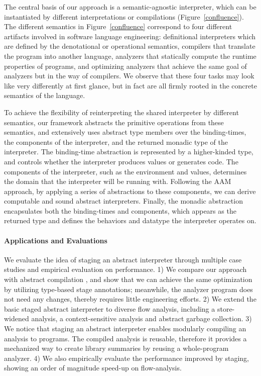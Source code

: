 The central basis of our approach is a semantic-agnostic interpreter, which can be
instantiated by different interpretations or compilations (Figure~\ref{confluence}).
The different semantics in Figure~\ref{confluence} correspond to four different
artifacts involved in software language engineering: definitional interpreters
which are defined by the denotational or operational semantics, compilers that
translate the program into another language, analyzers that statically compute the
runtime properties of programs, and optimizing analyzers that achieve the same goal
of analyzers but in the way of compilers. We observe that these four
tasks may look like very differently at first glance, but in fact are
all firmly rooted in the concrete semantics of the language.

To achieve the flexibility of reinterpreting the shared interpreter by
different semantics, our framework abstracts the primitive operations
from these semantics, and extensively uses abstract type members over
the binding-times, the components of the interpreter, and the returned
monadic type of the interpreter. The binding-time abstraction is
represented by a higher-kinded type, and controls whether the
interpreter produces values or generates code. The components of the
interpreter, such as the environment and values, determines the domain
that the interpreter will be running with. Following the AAM approach,
by applying a series of abstractions to these components, we can
derive computable and sound abstract interpreters. Finally, the
monadic abstraction encapsulates both the binding-times and
components, which appears as the returned type and defines the
behaviors and datatype the interpreter operates on.

\paragraph{Applications and Evaluations}
We evaluate the idea of staging an abstract interpreter through
multiple case studies and empirical evaluation on performance.
1) We compare our approach with abstract compilation
\cite{Boucher:1996:ACN:647473.727587}, and show that we can achieve
the same optimization by utilizing type-based stage annotations;
meanwhile, the analyzer program does not need any changes, thereby
requires little engineering efforts.
2) We extend the basic staged abstract interpreter to diverse flow
analysis, including a store-widened analysis, a context-sensitive
analysis and abstract garbage collection.
3) We notice that staging an abstract interpreter enables modularly
compiling an analysis to programs. The compiled analysis is reusable,
therefore it provides a mechanized way to create library summaries by
reusing a whole-program analyzer.
4) We also empirically evaluate the performance improved by staging,
showing an order of magnitude speed-up on flow-analysis.


